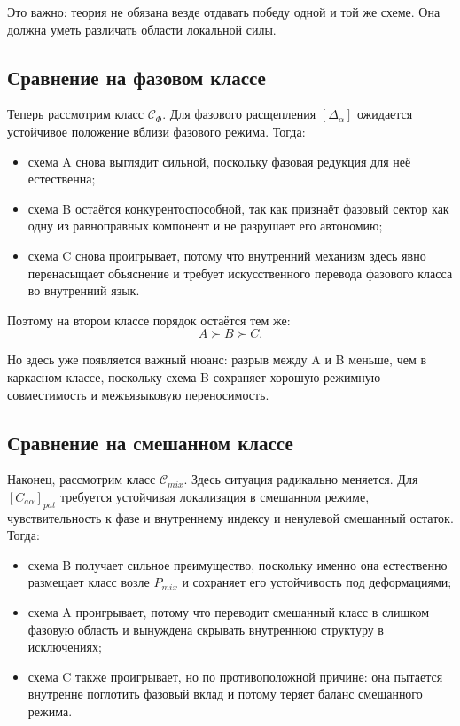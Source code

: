 \documentclass[12pt,a4paper]{article}
\begin{document}
Это важно: теория не обязана везде отдавать победу одной и той же схеме. Она должна уметь различать области локальной силы.

\subsection{Сравнение на фазовом классе}

Теперь рассмотрим класс \(\mathcal{C}_{\Phi}\). Для фазового расщепления \([\Delta_{\alpha}]\) ожидается устойчивое положение вблизи фазового режима. Тогда:
\begin{itemize}
    \item схема A снова выглядит сильной, поскольку фазовая редукция для неё естественна;
    \item схема B остаётся конкурентоспособной, так как признаёт фазовый сектор как одну из равноправных компонент и не разрушает его автономию;
    \item схема C снова проигрывает, потому что внутренний механизм здесь явно перенасыщает объяснение и требует искусственного перевода фазового класса во внутренний язык.
\end{itemize}

Поэтому на втором классе порядок остаётся тем же:
\begin{equation}
A \succ B \succ C.
\end{equation}

Но здесь уже появляется важный нюанс: разрыв между A и B меньше, чем в каркасном классе, поскольку схема B сохраняет хорошую режимную совместимость и межъязыковую переносимость.

\subsection{Сравнение на смешанном классе}

Наконец, рассмотрим класс \(\mathcal{C}_{mix}\). Здесь ситуация радикально меняется. Для \([C_{a\alpha}]_{pat}\) требуется устойчивая локализация в смешанном режиме, чувствительность к фазе и внутреннему индексу и ненулевой смешанный остаток. Тогда:
\begin{itemize}
    \item схема B получает сильное преимущество, поскольку именно она естественно размещает класс возле \(P_{mix}\) и сохраняет его устойчивость под деформациями;
    \item схема A проигрывает, потому что переводит смешанный класс в слишком фазовую область и вынуждена скрывать внутреннюю структуру в исключениях;
    \item схема C также проигрывает, но по противоположной причине: она пытается внутренне поглотить фазовый вклад и потому теряет баланс смешанного режима.
\end{itemize}
\end{document}
